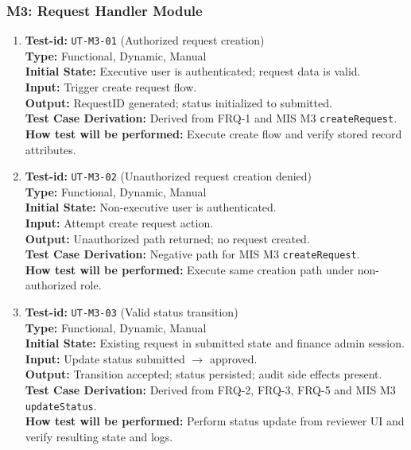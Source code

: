 \documentclass[12pt, titlepage]{article}
\begin{document}
\subsubsection{M3: Request Handler Module}

\begin{enumerate}

\item \textbf{Test-id:} \texttt{UT-M3-01} (Authorized request creation)\\
\textbf{Type:} Functional, Dynamic, Manual\\
\textbf{Initial State:} Executive user is authenticated; request data is valid.\\
\textbf{Input:} Trigger create request flow.\\
\textbf{Output:} RequestID generated; status initialized to submitted.\\
\textbf{Test Case Derivation:} Derived from FRQ-1 and MIS M3 \texttt{createRequest}.\\
\textbf{How test will be performed:} Execute create flow and verify stored record attributes.

\item \textbf{Test-id:} \texttt{UT-M3-02} (Unauthorized request creation denied)\\
\textbf{Type:} Functional, Dynamic, Manual\\
\textbf{Initial State:} Non-executive user is authenticated.\\
\textbf{Input:} Attempt create request action.\\
\textbf{Output:} Unauthorized path returned; no request created.\\
\textbf{Test Case Derivation:} Negative path for MIS M3 \texttt{createRequest}.\\
\textbf{How test will be performed:} Execute same creation path under non-authorized role.

\item \textbf{Test-id:} \texttt{UT-M3-03} (Valid status transition)\\
\textbf{Type:} Functional, Dynamic, Manual\\
\textbf{Initial State:} Existing request in submitted state and finance admin session.\\
\textbf{Input:} Update status submitted $\rightarrow$ approved.\\
\textbf{Output:} Transition accepted; status persisted; audit side effects present.\\
\textbf{Test Case Derivation:} Derived from FRQ-2, FRQ-3, FRQ-5 and MIS M3 \texttt{updateStatus}.\\
\textbf{How test will be performed:} Perform status update from reviewer UI and verify resulting state and logs.


\end{enumerate}
\end{document}
